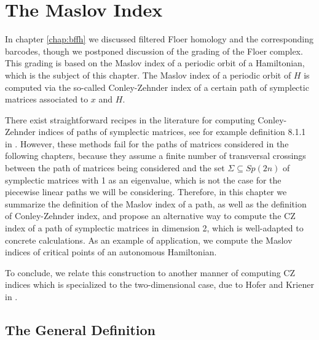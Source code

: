 \chapter{The Maslov Index}\label{chap:maslov}

In chapter \ref{chap:bffh} we discussed filtered Floer homology and the corresponding barcodes, though we postponed discussion of the grading of the Floer complex. This grading is based on the Maslov index of a periodic orbit of a Hamiltonian, which is the subject of this chapter. The Maslov index of a periodic orbit of $H$ is computed via the so-called Conley-Zehnder index of a certain path of symplectic matrices associated to $x$ and $H$.

There exist straightforward recipes in the literature for computing Conley-Zehnder indices of paths of symplectic matrices, see for example definition 8.1.1 in \cite{polterovich}. However, these methods fail for the paths of matrices considered in the following chapters, because they assume a finite number of transversal crossings between the path of matrices being considered and the set $\Sigma \subseteq Sp(2n)$ of symplectic matrices with 1 as an eigenvalue, which is not the case for the piecewise linear paths we will be considering. Therefore, in this chapter we summarize the definition of the Maslov index of a path, as well as the definition of Conley-Zehnder index, and propose an alternative way to compute the CZ index of a path of symplectic matrices in dimension 2, which is well-adapted to concrete calculations. As an example of application, we compute the Maslov indices of critical points of an autonomous Hamiltonian.

To conclude, we relate this construction to another manner of computing CZ indices which is specialized to the two-dimensional case, due to Hofer and Kriener in \cite{hoferkriener}.

\section{The General Definition}

